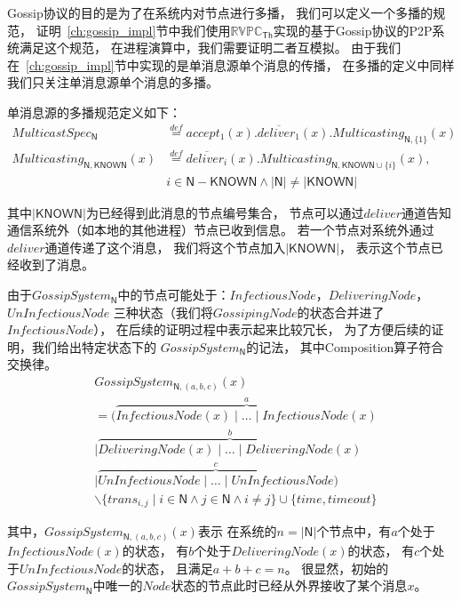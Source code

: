 Gossip协议的目的是为了在系统内对节点进行多播，
我们可以定义一个多播的规范，
证明~\ref{ch:gossip_impl}节中我们使用$\mathbb{RVPC}_{\mathsf{Th}}$实现的基于Gossip协议的P2P系统满足这个规范，
在进程演算中，我们需要证明二者互模拟。
由于我们在~\ref{ch:gossip_impl}节中实现的是单消息源单个消息的传播，
在多播的定义中同样我们只关注单消息源单个消息的多播。
\begin{definition} 单消息源的多播规范定义如下：
\begin{align*} 
    MulticastSpec_\mathsf{N}&\stackrel{def}{=}accept_1(x).\overline{deliver_1}(x).Multicasting_{\mathsf{N},\{1\}}(x)\\
    Multicasting_{\mathsf{N},\mathsf{KNOWN}}(x)&\stackrel{def}{=}\overline{deliver_i}(x).Multicasting_{\mathsf{N},\mathsf{KNOWN}\cup\{i\}}(x), \\
    &i\in \mathsf{N}-\mathsf{KNOWN} \wedge |\mathsf{N}|\neq |\mathsf{KNOWN}|
 \end{align*}
\end{definition} 
其中$|\mathsf{KNOWN}|$为已经得到此消息的节点编号集合，
节点可以通过$deliver$通道告知通信系统外（如本地的其他进程）节点已收到信息。
若一个节点对系统外通过$deliver$通道传递了这个消息，
我们将这个节点加入$|\mathsf{KNOWN}|$，
表示这个节点已经收到了消息。

 \begin{definition} 
   由于$GossipSystem_{\mathsf{N}}$中的节点可能处于：$InfectiousNode$，$DeliveringNode$，$UnInfectiousNode$
   三种状态（我们将$GossipingNode$的状态合并进了$InfectiousNode$），
   在后续的证明过程中表示起来比较冗长，
   为了方便后续的证明，我们给出特定状态下的
   $GossipSystem_{\mathsf{N}}$的记法，
   其中Composition算子符合交换律。
    \begin{align*}
   &GossipSystem_{\mathsf{N},(a,b,c)}(x)\\
   &= (\stackrel{a}{\overbrace{InfectiousNode(x)\mid \dots \mid InfectiousNode(x)}}\\
   &\mid \stackrel{b}{\overbrace{DeliveringNode(x)\mid \dots\mid DeliveringNode(x)}}\\
   &\mid \stackrel{c}{\overbrace{UnInfectiousNode\mid \dots \mid UnInfectiousNode}})\\
   &\backslash \{trans_{i,j}\mid i\in \mathsf{N} \wedge j\in \mathsf{N} \wedge i\neq j\}\cup \{time, timeout\}
\end{align*}
 \end{definition}
 其中，$GossipSystem_{\mathsf{N},(a,b,c)}(x)$表示
 在系统的$n=|\mathsf{N}|$个节点中，有$a$个处于$InfectiousNode(x)$的状态，
 有$b$个处于$DeliveringNode(x)$的状态，
 有$c$个处于$UnInfectiousNode$的状态，
 且满足$a+b+c=n$。
 很显然，初始的$GossipSystem_{\mathsf{N}}$中唯一的$Node$状态的节点此时已经从外界接收了某个消息$x$。

